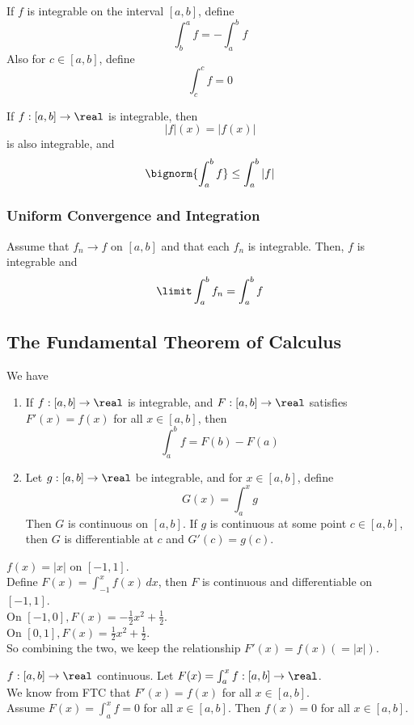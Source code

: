 \documentclass[11pt]{article}
\begin{document}
 If $f$ is integrable on the interval $[a,b]$, define
$$\int_b^a f = -\int_a^b f$$
Also for $c \in [a,b]$, define
$$\int_c^c f = 0$$

\fact If $f: [a,b] \rightarrow \real$ is integrable, then 
$$|f|(x) = |f(x)|$$
is also integrable, and
$$\bignorm{\int_a^b f} \leq \int_a^b |f|$$

\subsubsection{Uniform Convergence and Integration}
 Assume that $f_n \rightarrow f$  on $[a,b]$ and that each $f_n$ is integrable. Then, $f$ is integrable and 
$$ \limit \int_a^b f_n = \int_a^b f$$

\subsection{The Fundamental Theorem of Calculus}
We have
\begin{enumerate}
	\item If $f: [a,b] \rightarrow \real$ is integrable, and $F: [a,b] \rightarrow \real$ satisfies $F'(x) = f(x)$ for all $x \in [a,b]$, then
	$$\int_a^b f = F(b) - F(a)$$
	\item Let $g: [a,b] \rightarrow \real$ be integrable, and for $x \in [a,b]$, define
	$$G(x) = \int_a^x g$$
	Then $G$ is continuous on $[a,b]$. If $g$ is continuous at some point $c \in [a,b]$, then $G$ is differentiable at $c$ and $G'(c) = g(c)$.
\end{enumerate}

\example
$f(x) = |x|$ on $[-1, 1]$.\\
Define $F(x) = \int_{-1}^x f(x)\,dx$, then $F$ is continuous and differentiable on $[-1, 1]$.\\
On $[-1, 0], F(x) = -\frac{1}{2} x^2 + \frac{1}{2}$. \\
On $[0, 1], F(x) = \frac{1}{2}x^2 + \frac{1}{2}$. \\
So combining the two, we keep the relationship $F'(x) = f(x)( = |x|)$.

\example
$f: [a,b] \rightarrow \real$ continuous. Let $F(x) = \int_a^x f: [a,b] \rightarrow \real$.\\
We know from FTC that $F'(x) = f(x)$ for all $x \in [a,b]$. \\
Assume $F(x) = \int_a^x f = 0$ for all $x \in [a,b]$. Then $f(x) = 0$ for all $x \in [a,b]$.
\end{document}
